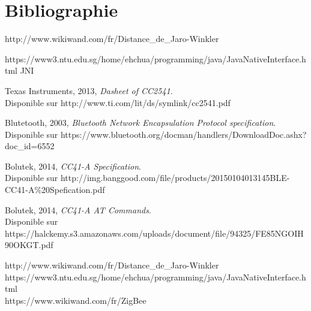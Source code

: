 \chapter*{Bibliographie}

	\noindent
	[1] http://www.wikiwand.com/fr/Distance_de_Jaro-Winkler

	\noindent
	[2] https://www3.ntu.edu.sg/home/ehchua/programming/java/JavaNativeInterface.html JNI

	\noindent
	[3] Texas Instruments, 2013, \emph{Dasheet of CC2541}. \\
	Disponible sur {\footnotesize http://www.ti.com/lit/ds/symlink/cc2541.pdf}
	
	\noindent
	[4] Blutetooth\texttrademark, 2003, 
	\emph{Bluetooth Network Encapsulation Protocol specification}. \\
	Disponible sur 
	{\footnotesize https://www.bluetooth.org/docman/handlers/DownloadDoc.ashx?doc_id=6552}
	
	\noindent 
	[5] Bolutek, 2014, \emph{CC41-A Specification}. \\
	Disponible sur 
	{\footnotesize http://img.banggood.com/file/products/20150104013145BLE-CC41-A\%20Spefication.pdf}
	
	\noindent 
	[6] Bolutek, 2014, \emph{CC41-A AT Commands}. \\
	Disponible sur 
	{\footnotesize https://halckemy.s3.amazonaws.com/uploads/document/file/94325/FE85NGOIH90OKGT.pdf}
	
	\noindent
	[7] http://www.wikiwand.com/fr/Distance_de_Jaro-Winkler \\
	
	\noindent
	[8] https://www3.ntu.edu.sg/home/ehchua/programming/java/JavaNativeInterface.html \\
	
	\noindent
	[9] https://www.wikiwand.com/fr/ZigBee
